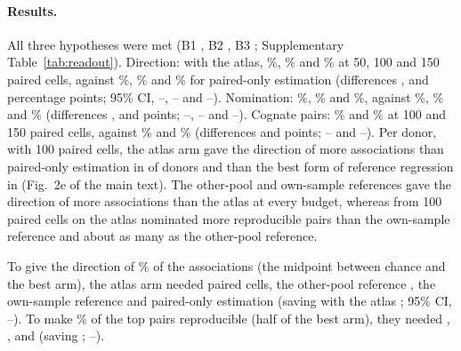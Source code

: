 \paragraph{Results.} All three hypotheses were met (B1 \BoBOne, B2 \BoBTwo, B3 \BoBThree; Supplementary Table~\ref{tab:readout}). Direction: with the atlas, \BoOneAtlasFifty\%, \BoOneAtlasHundred\% and \BoOneAtlasOneFifty\% at 50, 100 and 150 paired cells, against \BoOnePoFifty\%, \BoOnePoHundred\% and \BoOnePoOneFifty\% for paired-only estimation (differences \BoDiffOneFifty, \BoDiffOneHundred{} and \BoDiffOneOneFifty{} percentage points; 95\% CI, \BoDiffOneFiftyLo--\BoDiffOneFiftyHi, \BoDiffOneHundredLo--\BoDiffOneHundredHi{} and \BoDiffOneOneFiftyLo--\BoDiffOneOneFiftyHi). Nomination: \BoTwoAtlasFifty\%, \BoTwoAtlasHundred\% and \BoTwoAtlasOneFifty\%, against \BoTwoPoFifty\%, \BoTwoPoHundred\% and \BoTwoPoOneFifty\% (differences \BoDiffTwoFifty, \BoDiffTwoHundred{} and \BoDiffTwoOneFifty{} points; \BoDiffTwoFiftyLo--\BoDiffTwoFiftyHi, \BoDiffTwoHundredLo--\BoDiffTwoHundredHi{} and \BoDiffTwoOneFiftyLo--\BoDiffTwoOneFiftyHi). Cognate pairs: \BoThreeAtlasHundred\% and \BoThreeAtlasOneFifty\% at 100 and 150 paired cells, against \BoThreePoHundred\% and \BoThreePoOneFifty\% (differences \BoDiffThreeHundred{} and \BoDiffThreeOneFifty{} points; \BoDiffThreeHundredLo--\BoDiffThreeHundredHi{} and \BoDiffThreeOneFiftyLo--\BoDiffThreeOneFiftyHi). Per donor, with 100 paired cells, the atlas arm gave the direction of more associations than paired-only estimation in \RvDonorBetterPo{} of \RvDonorN{} donors and than the best form of reference regression in \RvDonorBetterReg{} (Fig.~2e of the main text). The other-pool and own-sample references gave the direction of more associations than the atlas at every budget, whereas from 100 paired cells on the atlas nominated more reproducible pairs than the own-sample reference and about as many as the other-pool reference.

To give the direction of \BoTargetOne\% of the associations (the midpoint between chance and the best arm), the atlas arm needed \BoCellsOneAtlas{} paired cells, the other-pool reference \BoCellsOneOther{}, the own-sample reference \BoCellsOneOwn{} and paired-only estimation \BoCellsOnePo{} (saving with the atlas \BoSaveOne; 95\% CI, \BoSaveOneLo--\BoSaveOneHi). To make \BoTargetTwo\% of the top pairs reproducible (half of the best arm), they needed \BoCellsTwoAtlas, \BoCellsTwoOther, \BoCellsTwoOwn{} and \BoCellsTwoPo{} (saving \BoSaveTwo; \BoSaveTwoLo--\BoSaveTwoHi).

